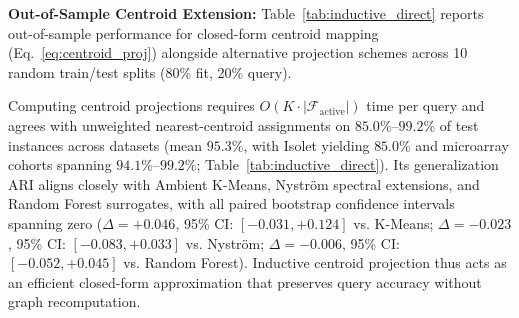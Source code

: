 \documentclass[pdflatex,sn-mathphys-num]{sn-jnl}
\theoremstyle{thmstyleone}
\theoremstyle{thmstyletwo}
\theoremstyle{thmstylethree}
\begin{document}
\textbf{Out-of-Sample Centroid Extension:}
Table~\ref{tab:inductive_direct} reports out-of-sample performance for closed-form centroid mapping (Eq.~\eqref{eq:centroid_proj}) alongside alternative projection schemes across 10 random train/test splits (80\% fit, 20\% query).



Computing centroid projections requires $O(K \cdot |\mathcal{F}_{\text{active}}|)$ time per query and agrees with unweighted nearest-centroid assignments on $85.0\%$--$99.2\%$ of test instances across datasets (mean $95.3\%$, with Isolet yielding $85.0\%$ and microarray cohorts spanning $94.1\%$--$99.2\%$; Table~\ref{tab:inductive_direct}). Its generalization ARI aligns closely with Ambient K-Means, Nystr\"om spectral extensions, and Random Forest surrogates, with all paired bootstrap confidence intervals spanning zero ($\Delta = +0.046$, 95\% CI: $[-0.031, +0.124]$ vs. K-Means; $\Delta = -0.023$, 95\% CI: $[-0.083, +0.033]$ vs. Nystr\"om; $\Delta = -0.006$, 95\% CI: $[-0.052, +0.045]$ vs. Random Forest). Inductive centroid projection thus acts as an efficient closed-form approximation that preserves query accuracy without graph recomputation.
\end{document}
